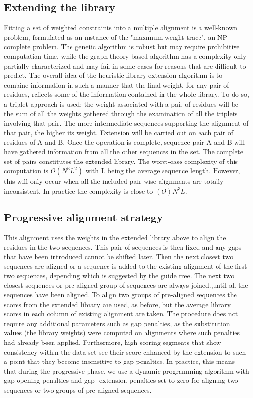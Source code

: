 \subsection{Extending the library}
Fitting a set of weighted constraints into a multiple alignment is a well-known problem, formulated as an instance of the "maximum weight trace", an NP-complete problem. The genetic algorithm is robust but may require prohibitive computation time, while the graph-theory-based algorithm has a complexity only partially characterized and may fail in some cases for reasons that are difficult to predict.
The overall idea of the heuristic library extension algorithm is to combine information in such a manner that the final weight, for any pair of residues, reflects some of the information contained in the whole library. To do so, a triplet approach is used: the weight associated with a pair of residues will be the sum of all the weights gathered through the examination of all the triplets involving that pair. 
The more intermediate sequences supporting the alignment of that pair, the higher its weight. 
Extension will be carried out on each pair of residues of A and B. Once the operation is complete, sequence pair A and B will have gathered information from all the other sequences in the set.  The complete set of pairs constitutes the extended library. 
The worst-case complexity of this computation is $O(N^3L^2)$ with L being the average sequence length. However, this will only occur when all the included pair-wise alignments are totally inconsistent. In practice the complexity is close to $(O)N^3L$.

\subsection{Progressive alignment strategy}
This alignment uses the weights in the extended library above to align the residues in the two sequences. This pair of sequences is then fixed and any gaps that have been introduced cannot be shifted later. Then the next closest two sequences are aligned or a sequence is added to the existing alignment of the first two sequences, depending which is suggested by the guide tree. The next two closest sequences or pre-aligned group of sequences are always joined.,until all the sequences have been aligned. 
To align two groups of pre-aligned sequences the scores from the extended library are used, as before, but the average library scores in each column of existing alignment are taken.
The procedure does not require any additional parameters such as gap penalties, as the substitution values (the library weights) were computed on alignments where such penalties had already been applied.  Furthermore, high scoring segments that show consistency within the data set see their score enhanced by the extension to such a point that they become insensitive to gap penalties. In practice, this means that during the progressive phase, we use a dynamic-programming algorithm with gap-opening penalties and gap- extension penalties set to zero for aligning two sequences or two groups of pre-aligned sequences.

